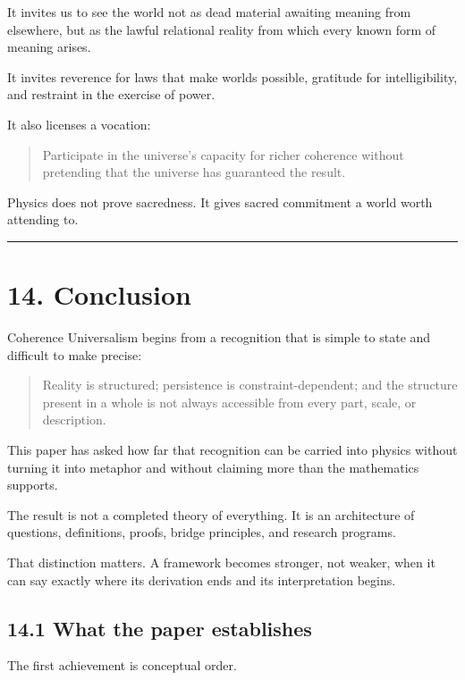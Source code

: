 \documentclass[
  11pt,
]{article}
\begin{document}
It invites us to see the world not as dead material awaiting meaning
from elsewhere, but as the lawful relational reality from which every
known form of meaning arises.

It invites reverence for laws that make worlds possible, gratitude for
intelligibility, and restraint in the exercise of power.

It also licenses a vocation:

\begin{quote}
Participate in the universe's capacity for richer coherence without
pretending that the universe has guaranteed the result.
\end{quote}

Physics does not prove sacredness. It gives sacred commitment a world
worth attending to.

\begin{center}\rule{0.5\linewidth}{0.5pt}\end{center}

\section{14. Conclusion}\label{conclusion}

Coherence Universalism begins from a recognition that is simple to state
and difficult to make precise:

\begin{quote}
Reality is structured; persistence is constraint-dependent; and the
structure present in a whole is not always accessible from every part,
scale, or description.
\end{quote}

This paper has asked how far that recognition can be carried into
physics without turning it into metaphor and without claiming more than
the mathematics supports.

The result is not a completed theory of everything. It is an
architecture of questions, definitions, proofs, bridge principles, and
research programs.

That distinction matters. A framework becomes stronger, not weaker, when
it can say exactly where its derivation ends and its interpretation
begins.

\subsection{14.1 What the paper
establishes}\label{what-the-paper-establishes}

The first achievement is conceptual order.
\end{document}
